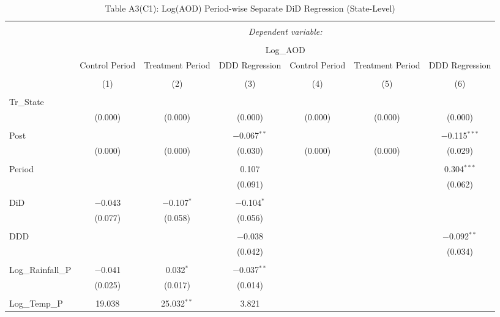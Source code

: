 
\begin{table}[!htbp] \centering 
  \caption{Table A3(C1): Log(AOD) Period-wise Separate DiD Regression (State-Level)} 
  \label{} 
\begin{tabular}{@{\extracolsep{5pt}}lcccccc} 
\\[-1.8ex]\hline 
\hline \\[-1.8ex] 
 & \multicolumn{6}{c}{\textit{Dependent variable:}} \\ 
\cline{2-7} 
\\[-1.8ex] & \multicolumn{6}{c}{Log\_AOD} \\ 
 & Control Period & Treatment Period & DDD Regression & Control Period & Treatment Period & DDD Regression \\ 
\\[-1.8ex] & (1) & (2) & (3) & (4) & (5) & (6)\\ 
\hline \\[-1.8ex] 
 Tr\_State &  &  &  &  &  &  \\ 
  & (0.000) & (0.000) & (0.000) & (0.000) & (0.000) & (0.000) \\ 
  & & & & & & \\ 
 Post &  &  & $-$0.067$^{**}$ &  &  & $-$0.115$^{***}$ \\ 
  & (0.000) & (0.000) & (0.030) & (0.000) & (0.000) & (0.029) \\ 
  & & & & & & \\ 
 Period &  &  & 0.107 &  &  & 0.304$^{***}$ \\ 
  &  &  & (0.091) &  &  & (0.062) \\ 
  & & & & & & \\ 
 DiD & $-$0.043 & $-$0.107$^{*}$ & $-$0.104$^{*}$ &  &  &  \\ 
  & (0.077) & (0.058) & (0.056) &  &  &  \\ 
  & & & & & & \\ 
 DDD &  &  & $-$0.038 &  &  & $-$0.092$^{**}$ \\ 
  &  &  & (0.042) &  &  & (0.034) \\ 
  & & & & & & \\ 
 Log\_Rainfall\_P & $-$0.041 & 0.032$^{*}$ & $-$0.037$^{**}$ &  &  &  \\ 
  & (0.025) & (0.017) & (0.014) &  &  &  \\ 
  & & & & & & \\ 
 Log\_Temp\_P & 19.038 & 25.032$^{**}$ & 3.821 &  &  &  \\ 

\end{tabular}
\end{table}
